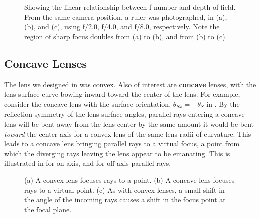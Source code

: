 \begin{figure}
{}
\caption{Showing the linear relationship between f-number and depth of field.  From the same camera position, a ruler was photographed, in (a), (b), and (c), using f/2.0, f/4.0, and f/8.0, respectively.  Note the region of sharp focus doubles from (a) to (b), and from (b) to (c).}
\label{fig:rulers}
\end{figure}




\subsection{Concave Lenses}

The lens we designed in \sect{\ref{sect:lensmaker}} was convex.  Also of interest are {\bf concave} lenses, with the lens surface curve bowing inward toward the center of the lens. For example, consider the concave lens with the surface orientation, $\theta_{Sx} = -\theta_S$ in \eqn{\ref{eq:lensmaker}}.  By the reflection symmetry of the lens surface angles, parallel rays entering a concave lens will be bent away from the lens center by the same amount it would be bent {\em toward} the center axis for a convex lens of the same lens radii of curvature.  This leads to a concave lens bringing parallel rays to a virtual focus, a point from which the diverging rays leaving the lens appear to be emanating.  This is 
illustrated in  for on-axis, and  for off-axis parallel rays.


\begin{figure}
\centerline{
}
\caption{(a) A convex lens focuses rays to a point.  (b) A concave lens focuses rays to a virtual point.  (c) As with convex lenses, a small shift in the angle of the incoming rays causes a shift in the focus point at the focal plane.}
\label{fig:ConcaveLenses}
\end{figure}


